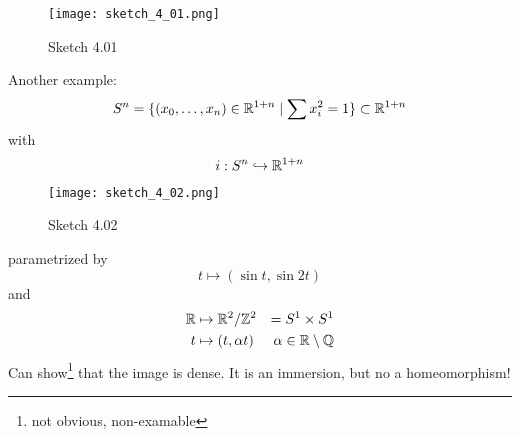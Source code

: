 \begin{example}
    \begin{figure}[H]
        \centering
        \texttt{[image: sketch\_4\_01.png]}
        \caption{Sketch 4.01}
    \end{figure}
    Another example: \[S^n=\{(x_0,\dots,x_n)\in\mathbb{R}^{1+n}\mid\sum x_i^2=1\}\subset\mathbb{R}^{1+n}\]
    with \[i:S^n\hookrightarrow \mathbb{R}^{1+n}\]

    \begin{figure}[H]
        \centering
        \texttt{[image: sketch\_4\_02.png]}
        \caption{Sketch 4.02}
    \end{figure}
    parametrized by \[t\mapsto (\sin t,\sin 2t)\]
    and 
    \begin{align*}
        \mathbb{R}&\mapsto \mathbb{R}^2/\mathbb{Z}^2&=S^1\times S^1\\
        t&\mapsto (t,\alpha t) & \alpha \in\mathbb{R}\setminus \mathbb{Q} 
    \end{align*}
    Can show\footnote{not obvious, non-examable} that the image is dense. It is an immersion, but no a homeomorphism!
\end{example}








